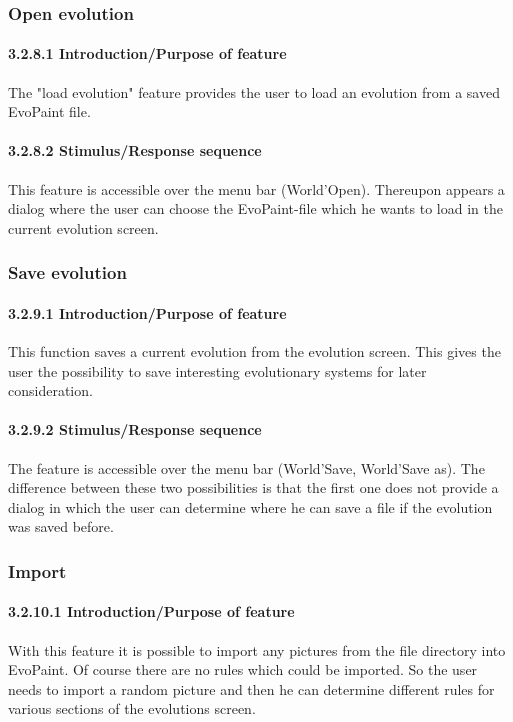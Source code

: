 \documentclass[titlepage,12pt]{scrartcl}
\begin{document}
\subsubsection{Open evolution}
\paragraph{3.2.8.1	Introduction/Purpose of feature}
The "load evolution" feature provides the user to load an evolution from a saved EvoPaint file. 
\paragraph{3.2.8.2	Stimulus/Response sequence}
This feature is accessible over the menu bar (World'Open). Thereupon appears a dialog where the user can choose the EvoPaint-file which he wants to load in the current evolution screen.

\subsubsection{Save evolution}
\paragraph{3.2.9.1	Introduction/Purpose of feature}
This function saves a current evolution from the evolution screen. This gives the user the possibility to save interesting evolutionary systems for later consideration.
\paragraph{3.2.9.2	Stimulus/Response sequence}
The feature is accessible over the menu bar (World'Save, World'Save as). The difference between these two possibilities is that the first one does not provide a dialog in which the user can determine where he can save a file if the evolution was saved before.

\subsubsection{Import}
\paragraph{3.2.10.1	Introduction/Purpose of feature}
With this feature it is possible to import any pictures from the file directory into EvoPaint. Of course there are no rules which could be imported. So the user needs to import a random picture and then he can determine different rules for various sections of the evolutions screen.
\end{document}
